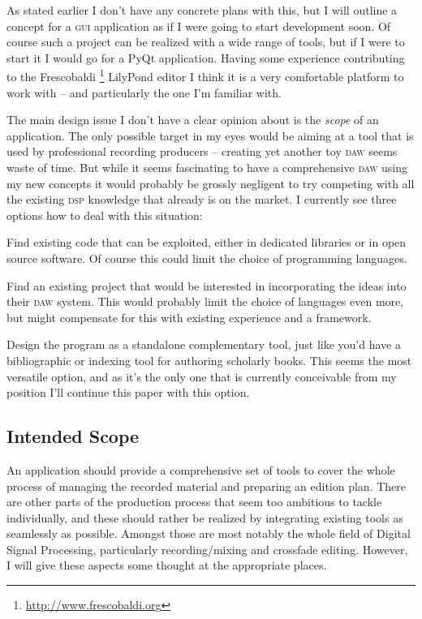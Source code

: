 \documentclass[11pt,a4paper]{article}
\begin{document}
As stated earlier I don't have any concrete plans with this, but I will outline a concept for a \textsc{gui} application as if I were going to start development soon.
Of course such a project can be realized with a wide range of tools, but if I were to start it I would go for a PyQt application.
Having some experience contributing to the Frescobaldi%
\footnote{\url{http://www.frescobaldi.org}}
LilyPond editor I think it is a very comfortable platform to work with -- and particularly the one I'm familiar with.

The main design issue I don't have a clear opinion about is the \emph{scope} of an application.
The only possible target in my eyes would be aiming at a tool that is used by professional recording producers -- creating yet another toy \textsc{daw} seems waste of time.
But while it seems fascinating to have a comprehensive \textsc{daw} using my new concepts it would probably be grossly negligent to try competing with all the existing \textsc{dsp} knowledge that already is on the market.
I currently see three options how to deal with this situation:

\begin{itemize*}
\item Find existing code that can be exploited, either in dedicated libraries or in open source software.
Of course this could limit the choice of programming languages.
\item Find an existing project that would be interested in incorporating the ideas into their \textsc{daw} system.
This would probably limit the choice of languages even more, but might compensate for this with existing experience and a framework.
\item Design the program as a standalone complementary tool, just like you'd have a bibliographic or indexing tool for authoring scholarly books.
This seems the most versatile option, and as it's the only one that is currently conceivable from my position I'll continue this paper with this option.
\end{itemize*}


\subsection{Intended Scope}

An application should provide a comprehensive set of tools to cover the whole process of managing the recorded material and preparing an edition plan.
There are other parts of the production process that seem too ambitious to tackle individually, and these should rather be realized by integrating existing tools as seamlessly as possible.
Amongst those are most notably the whole field of Digital Signal Processing, particularly recording/mixing and crossfade editing.
However, I will give these aspects some thought at the appropriate places.
\end{document}
